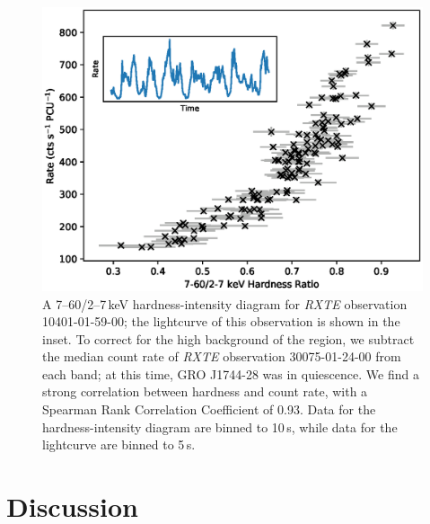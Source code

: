 \begin{figure}
 \centering
 \includegraphics[width=.82\linewidth, trim={0.6cm 0.1cm 1.0cm 1.1cm},clip]{images/hr.eps}
 \caption{\small A 7--60/2--7\,keV hardness-intensity diagram for \textit{RXTE} observation 10401-01-59-00; the lightcurve of this observation is shown in the inset. To correct for the high background of the region, we subtract the median count rate of \textit{RXTE} observation 30075-01-24-00 from each band; at this time, GRO J1744-28 was in quiescence. We find a strong correlation between hardness and count rate, with a Spearman Rank Correlation Coefficient of 0.93. Data for the hardness-intensity diagram are binned to 10\,s, while data for the lightcurve are binned to 5\,s.}
 \label{fig:HR}
\end{figure}

\vspace{-2em} %

%
%
%
%


\section{Discussion}

